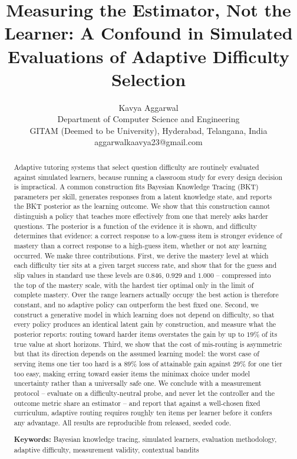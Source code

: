 \documentclass[notitlepage,12pt]{jedm}
\begin{document}
\title{Measuring the Estimator, Not the Learner: A Confound in Simulated Evaluations of Adaptive Difficulty Selection}
\date{}

\author{{\large Kavya Aggarwal}\\Department of Computer Science and Engineering\\GITAM (Deemed to be University), Hyderabad, Telangana, India\\aggarwalkaavya23@gmail.com}

\maketitle

\begin{abstract}
Adaptive tutoring systems that select question difficulty are routinely evaluated against simulated learners, because running a classroom study for every design decision is impractical. A common construction fits Bayesian Knowledge Tracing (BKT) parameters per skill, generates responses from a latent knowledge state, and reports the BKT posterior as the learning outcome. We show that this construction cannot distinguish a policy that teaches more effectively from one that merely asks harder questions. The posterior is a function of the evidence it is shown, and difficulty determines that evidence: a correct response to a low-guess item is stronger evidence of mastery than a correct response to a high-guess item, whether or not any learning occurred. We make three contributions. First, we derive the mastery level at which each difficulty tier sits at a given target success rate, and show that for the guess and slip values in standard use these levels are $0.846$, $0.929$ and $1.000$ -- compressed into the top of the mastery scale, with the hardest tier optimal only in the limit of complete mastery. Over the range learners actually occupy the best action is therefore constant, and no adaptive policy can outperform the best fixed one. Second, we construct a generative model in which learning does not depend on difficulty, so that every policy produces an identical latent gain by construction, and measure what the posterior reports: routing toward harder items overstates the gain by up to $19\%$ of its true value at short horizons. Third, we show that the cost of mis-routing is asymmetric but that its direction depends on the assumed learning model: the worst case of serving items one tier too hard is a $89\%$ loss of attainable gain against $29\%$ for one tier too easy, making erring toward easier items the minimax choice under model uncertainty rather than a universally safe one. We conclude with a measurement protocol -- evaluate on a difficulty-neutral probe, and never let the controller and the outcome metric share an estimator -- and report that against a well-chosen fixed curriculum, adaptive routing requires roughly ten items per learner before it confers any advantage. All results are reproducible from released, seeded code.

{\parindent0pt
\textbf{Keywords:} Bayesian knowledge tracing, simulated learners, evaluation methodology, adaptive difficulty, measurement validity, contextual bandits
}
\end{abstract}
\end{document}
